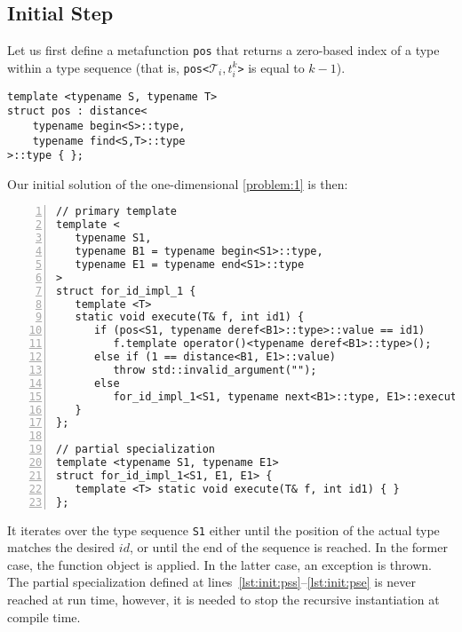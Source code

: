 \documentclass[10pt,a4paper]{article}
\theoremstyle{definition}\newtheorem{problem}{Problem}
\providecommand{\symtypeset}[1]{\ensuremath{\mathcal{T}_{#1}}}
\providecommand{\symtype}[2]{\ensuremath{t_{#1}^{#2}}}
\providecommand{\symidb}{\ensuremath{\mathit{id}}}
\providecommand{\symidbx}{\symidb\xspace}
\providecommand{\pos}{\texttt{pos}\xspace}
\begin{document}
\subsection{Initial Step}
\label{sec:initstep}

Let us first define a metafunction \pos that returns a zero-based index of a type within a type sequence (that is, \pos\texttt{<}$\symtypeset{i},\symtype{i}{k}$\texttt{>} is equal to $k-1$). \\
\begin{lstlisting}
template <typename S, typename T>
struct pos : distance<
    typename begin<S>::type,
    typename find<S,T>::type
>::type { };
\end{lstlisting}
Our initial solution of the one-dimensional \autoref{problem:1} is then:
{\small
\begin{lstlisting}[numbers=left,xleftmargin=2em]
// primary template
template <                                                                        (* \label{lst:init:pts} *)
   typename S1,
   typename B1 = typename begin<S1>::type,                                        (* \label{lst:init:b} *)
   typename E1 = typename end<S1>::type                                           (* \label{lst:init:e} *) 
>
struct for_id_impl_1 { 
   template <T>                                                                   (* \label{lst:init:exs} *)
   static void execute(T& f, int id1) {
      if (pos<S1, typename deref<B1>::type>::value == id1)                        (* \label{lst:init:condo} *)
         f.template operator()<typename deref<B1>::type>();                       (* \label{lst:init:appl} *)
      else if (1 == distance<B1, E1>::value)                                      (* \label{lst:init:condt} *)
         throw std::invalid_argument("");
      else
         for_id_impl_1<S1, typename next<B1>::type, E1>::execute(f, id1);         (* \label{lst:init:rec} *)
   }                                                                              (* \label{lst:init:exe} *)
};                                                                                (* \label{lst:init:ets} *)

// partial specialization
template <typename S1, typename E1>                                               (* \label{lst:init:pss} *)
struct for_id_impl_1<S1, E1, E1> { 
   template <T> static void execute(T& f, int id1) { }
};                                                                                (* \label{lst:init:pse} *)
\end{lstlisting}
}
\noindent
It iterates over the type sequence \texttt{S1} either until the position of the actual type matches the desired \symidbx, or until the end of the sequence is reached. In the former case, the function object is applied. In the latter case, an exception is thrown. The partial specialization defined at lines~\ref{lst:init:pss}--\ref{lst:init:pse} is never reached at run time, however, it is needed to stop the recursive instantiation at compile time. 
\end{document}
